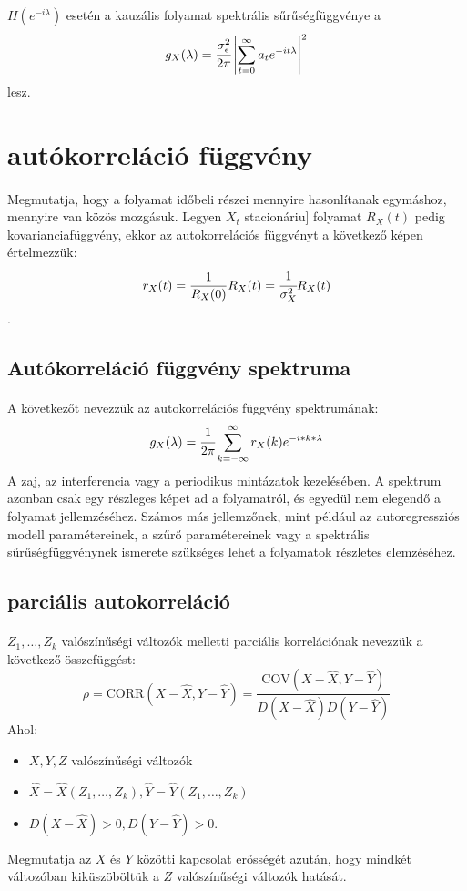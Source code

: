 \documentclass[11pt,a4pape,draftr]{article}
\begin{document}
					\paragraph{}
						$H \left(e^{-i \lambda} \right)$ esetén a kauzális folyamat spektrális sűrűségfüggvénye a
						$$g_X(\lambda) = \cfrac{\sigma_\epsilon^2}{2 \pi} \left| \sum_{t=0}^\infty a_t e^{-it\lambda}\right|^2$$ lesz.
			\section{autókorreláció függvény}
				\paragraph{}
					Megmutatja, hogy a folyamat időbeli részei mennyire hasonlítanak egymáshoz, mennyire van közös mozgásuk.
					Legyen $X_t$ stacionáriu] folyamat $R_X(t)$ pedig kovarianciafüggvény, ekkor az autokorrelációs függvényt a következő képen értelmezzük:
					$$r_X(t) = \dfrac{1}{R_X(0)}R_X(t) = \cfrac{1}{\sigma_X^2}R_X(t)$$.
				\subsection{Autókorreláció függvény spektruma}
					\paragraph{}
						A következőt nevezzük az autokorrelációs függvény spektrumának:
						$$g_X(\lambda) = \cfrac{1}{2 \pi} \sum_{k = - \infty} ^{\infty} r_X(k) e^{-i * k *\lambda}$$
						A zaj, az interferencia vagy a periodikus mintázatok kezelésében. A spektrum azonban csak egy részleges képet ad a folyamatról, és egyedül nem elegendő a folyamat jellemzéséhez. Számos más jellemzőnek, mint például az autoregressziós modell paramétereinek, a szűrő paramétereinek vagy a spektrális sűrűségfüggvénynek ismerete szükséges lehet a folyamatok részletes elemzéséhez.
				\subsection{parciális autokorreláció}
					\paragraph{}
						$Z_1, \dots, Z_k$ valószínűségi változók melletti parciális korrelációnak nevezzük a következő összefüggést:
						$$\rho = \mathrm{CORR}(X - \hat{X}, Y - \hat{Y}) = \frac{\mathrm{COV}(X-\hat{X}, Y - \hat{Y})}{D(X - \hat{X})D(Y - \hat{Y})}$$
						Ahol:
						\begin{itemize}
							\item $X,Y,Z$ valószínűségi változók
							\item $\hat{X} = \hat{X}(Z_1, \dots, Z_k), \hat{Y} = \hat{Y}(Z_1, \dots, Z_k)$
							\item $D(X - \hat{X}) > 0, D(Y - \hat{Y}) > 0$.
						\end{itemize}
						Megmutatja az $X$ és $Y$ közötti kapcsolat erősségét azután, hogy mindkét változóban kiküszöböltük a $Z$ valószínűségi változók hatását.
\end{document}
